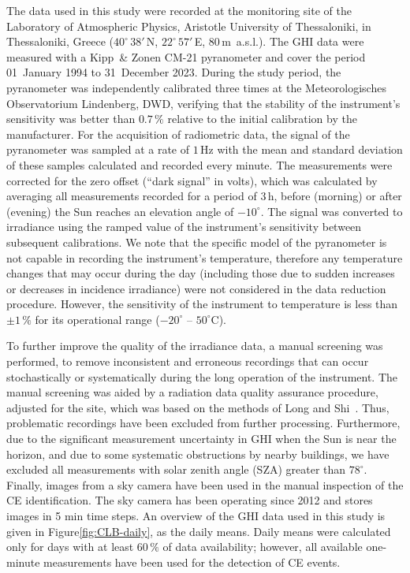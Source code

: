 \documentclass[preprint, 5p,
authoryear]{elsarticle} %
\begin{document}
The data used in this study were recorded at the monitoring site of the
Laboratory of Atmospheric Physics, Aristotle University of Thessaloniki,
in Thessaloniki, Greece (\(40^\circ\,38'\,\)N, \(22^\circ\,57'\,\)E,
\(80\,\)m~a.s.l.). The GHI data were measured with a Kipp~\& Zonen CM-21
pyranometer and cover the period 01~January 1994 to 31~December 2023.
During the study period, the pyranometer was independently calibrated
three times at the Meteorologisches Observatorium Lindenberg, DWD,
verifying that the stability of the instrument's sensitivity was better
than \(0.7\,\%\) relative to the initial calibration by the
manufacturer. For the acquisition of radiometric data, the signal of the
pyranometer was sampled at a rate of \(1\,\text{Hz}\) with the mean and
standard deviation of these samples calculated and recorded every
minute. The measurements were corrected for the zero offset (``dark
signal'' in volts), which was calculated by averaging all measurements
recorded for a period of \(3\,\text{h}\), before (morning) or after
(evening) the Sun reaches an elevation angle of \(-10^\circ\). The
signal was converted to irradiance using the ramped value of the
instrument's sensitivity between subsequent calibrations. We note that
the specific model of the pyranometer is not capable in recording the
instrument's temperature, therefore any temperature changes that may
occur during the day (including those due to sudden increases or
decreases in incidence irradiance) were not considered in the data
reduction procedure. However, the sensitivity of the instrument to
temperature is less than \(\pm1\,\%\) for its operational range
(\(-20^\circ\) -- \(50^\circ\)C).

To further improve the quality of the irradiance data, a manual
screening was performed, to remove inconsistent and erroneous recordings
that can occur stochastically or systematically during the long
operation of the instrument. The manual screening was aided by a
radiation data quality assurance procedure, adjusted for the site, which
was based on the methods of Long and Shi~\citep{Long2006, Long2008a}.
Thus, problematic recordings have been excluded from further processing.
Furthermore, due to the significant measurement uncertainty in GHI when
the Sun is near the horizon, and due to some systematic obstructions by
nearby buildings, we have excluded all measurements with solar zenith
angle (SZA) greater than \(78^\circ\). Finally, images from a sky camera
have been used in the manual inspection of the CE identification. The
sky camera has been operating since 2012 and stores images in 5 min time
steps. An overview of the GHI data used in this study is given in
Figure\nobreakspace{}\ref{fig:CLB-daily}, as the daily means. Daily
means were calculated only for days with at least \(60\,\%\) of data
availability; however, all available one-minute measurements have been
used for the detection of CE events.
\end{document}
